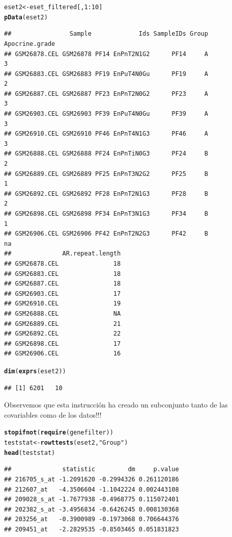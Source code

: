 \documentclass[a4paper]{article}\usepackage[]{graphicx}\usepackage[]{color}
\makeatletter
\newcommand{\hlnum}[1]{\textcolor[rgb]{0.686,0.059,0.569}{#1}}%
\newcommand{\hlstr}[1]{\textcolor[rgb]{0.192,0.494,0.8}{#1}}%
\newcommand{\hlopt}[1]{\textcolor[rgb]{0,0,0}{#1}}%
\newcommand{\hlstd}[1]{\textcolor[rgb]{0.345,0.345,0.345}{#1}}%
\newcommand{\hlkwb}[1]{\textcolor[rgb]{0.69,0.353,0.396}{#1}}%
\newcommand{\hlkwd}[1]{\textcolor[rgb]{0.737,0.353,0.396}{\textbf{#1}}}%
\newenvironment{kframe}{%
 \def\at@end@of@kframe{}%
 \ifinner\ifhmode%
  \def\at@end@of@kframe{\end{minipage}}%
  \begin{minipage}{\columnwidth}%
 \fi\fi%
 \def\FrameCommand##1{\hskip\@totalleftmargin \hskip-\fboxsep
 \colorbox{shadecolor}{##1}\hskip-\fboxsep
     \hskip-\linewidth \hskip-\@totalleftmargin \hskip\columnwidth}%
 \MakeFramed {\advance\hsize-\width
   \@totalleftmargin\z@ \linewidth\hsize
   \@setminipage}}%
 {\par\unskip\endMakeFramed%
 \at@end@of@kframe}
\newenvironment{knitrout}{}{} %
\makeatother
\begin{document}
\begin{knitrout}
\color{fgcolor}\begin{kframe}
\begin{alltt}
\hlstd{eset2} \hlkwb{<-} \hlstd{eset_filtered[,}\hlnum{1}\hlopt{:}\hlnum{10}\hlstd{]}
\hlkwd{pData}\hlstd{(eset2)}
\end{alltt}
\begin{verbatim}
##                Sample             Ids SampleIDs Group Apocrine.grade
## GSM26878.CEL GSM26878 PF14 EnPnT2N1G2      PF14     A              3
## GSM26883.CEL GSM26883 PF19 EnPuT4N0Gu      PF19     A              2
## GSM26887.CEL GSM26887 PF23 EnPnT2N0G2      PF23     A              3
## GSM26903.CEL GSM26903 PF39 EnPuT4N0Gu      PF39     A              3
## GSM26910.CEL GSM26910 PF46 EnPnT4N1G3      PF46     A              3
## GSM26888.CEL GSM26888 PF24 EnPnTiN0G3      PF24     B              2
## GSM26889.CEL GSM26889 PF25 EnPnT3N2G2      PF25     B              1
## GSM26892.CEL GSM26892 PF28 EnPnT2N1G3      PF28     B              2
## GSM26898.CEL GSM26898 PF34 EnPnT3N1G3      PF34     B              1
## GSM26906.CEL GSM26906 PF42 EnPnT2N2G3      PF42     B             na
##              AR.repeat.length
## GSM26878.CEL               18
## GSM26883.CEL               18
## GSM26887.CEL               18
## GSM26903.CEL               17
## GSM26910.CEL               19
## GSM26888.CEL               NA
## GSM26889.CEL               21
## GSM26892.CEL               22
## GSM26898.CEL               17
## GSM26906.CEL               16
\end{verbatim}
\begin{alltt}
\hlkwd{dim}\hlstd{(}\hlkwd{exprs}\hlstd{(eset2))}
\end{alltt}
\begin{verbatim}
## [1] 6201   10
\end{verbatim}
\end{kframe}
\end{knitrout}

Observemos que esta instrucción ha creado un subconjunto tanto de las covariables como de los datos!!!

\begin{knitrout}
\color{fgcolor}\begin{kframe}
\begin{alltt}
\hlkwd{stopifnot}\hlstd{(}\hlkwd{require}\hlstd{(genefilter))}
\hlstd{teststat} \hlkwb{<-}\hlkwd{rowttests}\hlstd{(eset2,} \hlstr{"Group"}\hlstd{)}
\hlkwd{head}\hlstd{(teststat)}
\end{alltt}
\begin{verbatim}
##              statistic         dm     p.value
## 216705_s_at -1.2091620 -0.2994326 0.261120186
## 212607_at   -4.3506604 -1.1042224 0.002443108
## 209028_s_at -1.7677938 -0.4968775 0.115072401
## 202382_s_at -3.4956834 -0.6426245 0.008130368
## 203256_at   -0.3900989 -0.1973068 0.706644376
## 209451_at   -2.2829535 -0.8503465 0.051831823
\end{verbatim}
\end{kframe}
\end{knitrout}
\end{document}

